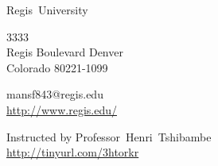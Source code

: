\documentclass[11pt,a4paper]{scrartcl} %
\begin{document}
\pagecolor{Gray!05!Bittersweet!07}
\begin{cv}{}
        \begin{cvlist}{\textcolor{brown}{}}\label{PersDat}  
            \item   Regis~University
            \item   3333\\
                    Regis Boulevard Denver \\	
                    Colorado 80221-1099
            \item   mansf843@regis.edu\\				
                    \url{http://www.regis.edu/}				
        \end{cvlist}
        \begin{cvlist}{}\label{irgendwas}
            \item Instructed by Professor~Henri~Tshibambe\\
             \url{http://tinyurl.com/3htorkr}
        \end{cvlist}
    \end{cv}
\clearpage
\end{document}
